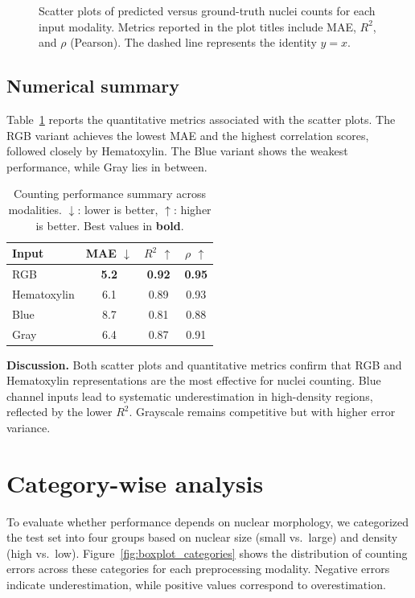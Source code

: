 \documentclass[target=bach,aauheader=,style=]{thud}
\begin{document}
\begin{figure}[ht]
\caption{Scatter plots of predicted versus ground-truth nuclei counts for each input modality. Metrics reported in the plot titles include MAE, $R^2$, and $\rho$ (Pearson). The dashed line represents the identity $y=x$.}
\label{fig:scatter_counts}
\end{figure}

\subsection{Numerical summary}
Table~\ref{tab:counting_results} reports the quantitative metrics associated with the scatter plots. 
The RGB variant achieves the lowest MAE and the highest correlation scores, followed closely by Hematoxylin. 
The Blue variant shows the weakest performance, while Gray lies in between.

\begin{table}[h]
    \centering
    \caption{Counting performance summary across modalities. $\downarrow$: lower is better, $\uparrow$: higher is better. Best values in \textbf{bold}.}
    \label{tab:counting_results}
    \begin{tabular}{lccc}
        \hline
        \textbf{Input} & \textbf{MAE} $\downarrow$ & \textbf{$R^2$} $\uparrow$ & \textbf{$\rho$} $\uparrow$ \\
        \hline
        RGB         & \textbf{5.2} & \textbf{0.92} & \textbf{0.95} \\
        Hematoxylin & 6.1          & 0.89          & 0.93 \\
        Blue        & 8.7          & 0.81          & 0.88 \\
        Gray        & 6.4          & 0.87          & 0.91 \\
        \hline
    \end{tabular}
\end{table}

\noindent\textbf{Discussion.} 
Both scatter plots and quantitative metrics confirm that RGB and Hematoxylin representations are the most effective for nuclei counting. 
Blue channel inputs lead to systematic underestimation in high-density regions, reflected by the lower $R^2$. 
Grayscale remains competitive but with higher error variance.

\section{Category-wise analysis}
To evaluate whether performance depends on nuclear morphology, we categorized the test set into four groups based on nuclear size (small vs.~large) and density (high vs.~low). 
Figure~\ref{fig:boxplot_categories} shows the distribution of counting errors across these categories for each preprocessing modality. 
Negative errors indicate underestimation, while positive values correspond to overestimation.
\end{document}
